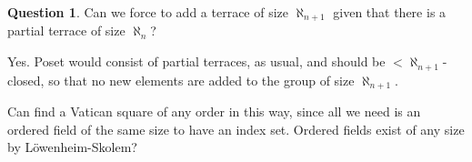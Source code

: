 \documentclass[11pt]{amsart}
\theoremstyle{definition}
\newtheorem{question}{Question}
\theoremstyle{remark}
\newcommand{\To}{\longrightarrow}
\newcommand{\g}{\textup{\textbf{g}}}
\begin{document}
%

\begin{question} Can we force to add a terrace of size $\aleph_{n+1}$ given that there is a partial terrace of size $\aleph_n$? \end{question}
Yes. Poset would consist of partial terraces, as usual, and should be $<\aleph_{n+1}$-closed, so that no new elements are added to the group of size $\aleph_{n+1}$. 

Can find a Vatican square of any order in this way, since all we need is an ordered field of the same size to have an index set. Ordered fields exist of any size by L\"owenheim-Skolem?




%
\end{document}

